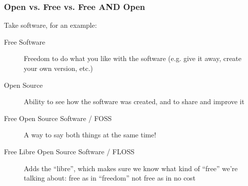\documentclass{beamer}
\begin{document}

\begin{frame}
  \frametitle{Open vs. Free vs. Free AND Open}

  Take software, for an example: 

  \begin{description}
  \item[Free Software] Freedom to do what you like with the software (e.g. give it away, create your own version, etc.)
  \item[Open Source] Ability to see how the software was created, and to share and improve it
  \item[Free Open Source Software / FOSS] A way to say both things at the same time!
  \item[Free Libre Open Source Software / FLOSS] Adds the ``libre'', which makes sure we know what kind of ``free'' we're talking about: free as in ``freedom'' not free as in no cost
  \end{description}
\end{frame}
\end{document}
